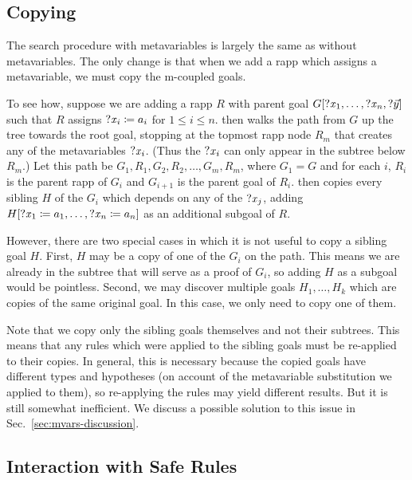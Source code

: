 \subsection{Copying}%
\label{sec:mvars-copying}

The search procedure with metavariables is largely the same as without
metavariables. The only change is that when we add a rapp which assigns a
metavariable, we must copy the m-coupled goals.

To see how, suppose we are adding a rapp $R$ with parent goal
$G[\mathit{?x}_{1},\dots,\mathit{?x}_{n},?\vec{y}]$ such that $R$ assigns
$\mathit{?x}_{i} \coloneqq a_{i}$ for $1 ≤ i ≤ n$. \Aesop{} then walks the path from
$G$ up the tree towards the root goal, stopping at the topmost rapp node $R_{m}$
that creates any of the metavariables $\mathit{?x}_{i}$. (Thus the $\mathit{?x}_{i}$ can
only appear in the subtree below $R_{m}$.) Let this path be
$G_{1}, R_{1}, G_{2}, R_{2}, \dots, G_{m}, R_{m}$, where $G_{1} = G$ and for
each $i$, $R_{i}$ is the parent rapp of $G_{i}$ and $G_{i+1}$ is the parent goal
of $R_{i}$. \Aesop{} then copies every sibling $H$ of the $G_{i}$ which depends
on any of the $\mathit{?x}_{j}$, adding
$H[\mathit{?x}_{1} \coloneqq a_{1},\dots,\mathit{?x}_{n} \coloneqq a_{n}]$ as an
additional subgoal of $R$.

However, there are two special cases in which it is not useful to copy a sibling
goal $H$. First, $H$ may be a copy of one of the $G_{i}$ on the path. This means
we are already in the subtree that will serve as a proof of $G_{i}$, so adding
$H$ as a subgoal would be pointless. Second, we may discover multiple goals
$H_{1}, \dots, H_{k}$ which are copies of the same original goal. In this case,
we only need to copy one of them.

Note that we copy only the sibling goals themselves and not their subtrees. This
means that any rules which were applied to the sibling goals must be re-applied
to their copies. In general, this is necessary because the copied goals have
different types and hypotheses (on account of the metavariable substitution we
applied to them), so re-applying the rules may yield different results. But it
is still somewhat inefficient. We discuss a possible solution to this issue in
Sec.~\ref{sec:mvars-discussion}.


\subsection{Interaction with Safe Rules}%
\label{sec:mvars-safe}

